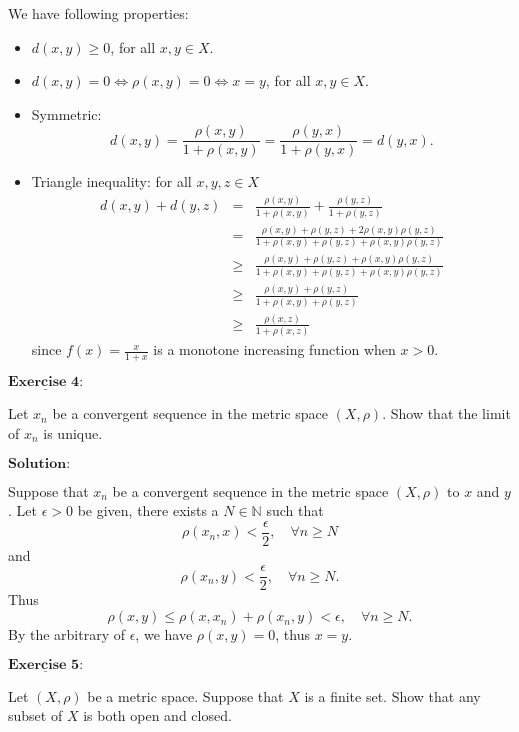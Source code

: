 \documentclass[12pt,a4paper]{ctexart}
\begin{document}
We have following properties:
\begin{itemize}
    \item $d(x, y) \geq 0$, for all $x, y \in X$.
    \item $d(x, y) = 0 \Leftrightarrow \rho(x, y) = 0 \Leftrightarrow x = y$, for all $x, y \in X$.
    \item Symmetric:
    $$d(x, y) = \frac{\rho(x,y)}{1 + \rho(x,y)} = \frac{\rho(y,x)}{1 + \rho(y,x)} = d(y, x).$$
    \item Triangle inequality: for all $x, y, z \in X$
    \begin{eqnarray*}
    d(x, y) + d(y, z) & = & \frac{\rho(x,y)}{1 + \rho(x,y)} + \frac{\rho(y,z)}{1 + \rho(y,z)}  \\
    & = & \frac{\rho(x,y) + \rho(y,z) + 2 \rho(x,y) \rho(y,z)}{1 + \rho(x,y) + \rho(y,z) + \rho(x,y) \rho(y,z)} \\
    & \geq & \frac{\rho(x,y) + \rho(y,z) + \rho(x,y) \rho(y,z)}{1 + \rho(x,y) + \rho(y,z) + \rho(x,y) \rho(y,z)} \\
    & \geq & \frac{\rho(x,y) + \rho(y,z)}{1 + \rho(x,y) + \rho(y,z)} \\
    & \geq & \frac{\rho(x,z)}{1 + \rho(x,z)}
\end{eqnarray*}
since $f(x) = \frac{x}{1+x}$ is a monotone increasing function when $x > 0$.
    
\end{itemize}


\newpage 

$\underline{\textbf{Exercise 4:}}$ 

Let $x_n$ be a convergent sequence in the metric space $(X, \rho)$. Show that the limit of $x_n$ is unique.

\vspace{8pt}
$\textbf{Solution:}$

Suppose that $x_n$ be a convergent sequence in the metric space $(X, \rho)$ to $x$ and $y$. Let $\epsilon > 0$ be given, there exists a $N \in \mathbb N$ such that
$$\rho(x_n, x) < \frac{\epsilon}{2}, \quad \forall n \geq N$$
and 
$$\rho(x_n, y) < \frac{\epsilon}{2}, \quad \forall n \geq N.$$
Thus
$$\rho(x, y) \leq \rho(x, x_n) + \rho(x_n, y) < \epsilon, \quad  \forall n \geq N.$$
By the arbitrary of $\epsilon$, we have $\rho(x,y) = 0$, thus $x = y$.

\newpage 

$\underline{\textbf{Exercise 5:}}$

Let $(X, \rho)$ be a metric space. Suppose that $X$ is a finite set. Show that any subset of $X$ is both open and closed.
\end{document}
